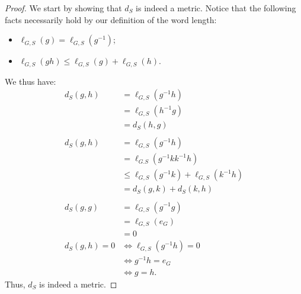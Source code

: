 \documentclass[10pt]{mypackage2}
\begin{document}
\begin{proof}
  We start by showing that $d_S$ is indeed a metric. Notice that the following facts necessarily hold by our definition of the word length:
  \begin{itemize}
    \item $\ell_{G,S}\left(g\right) = \ell_{G,S}\left(g^{-1}\right)$;
    \item $\ell_{G,S}\left(gh\right) \leq \ell_{G,S}\left(g\right) + \ell_{G,S}\left(h\right)$.
  \end{itemize}
  We thus have:
  \begin{align*}
    d_{S}\left(g,h\right) &= \ell_{G,S}\left(g^{-1}h\right)\\
                          &= \ell_{G,S}\left(h^{-1}g\right)\\
                          &= d_S\left(h,g\right)\\
                          \\
    d_{S}\left(g,h\right) &= \ell_{G,S}\left(g^{-1}h\right)\\
                          &= \ell_{G.S}\left(g^{-1}kk^{-1}h\right)\\
                          &\leq \ell_{G,S}\left(g^{-1}k\right) + \ell_{G,S}\left(k^{-1}h\right)\\
                          &= d_{S}\left(g,k\right) + d_{S}\left(k,h\right)\\
                          \\
    d_{S}\left(g,g\right) &= \ell_{G,S}\left(g^{-1}g\right)\\
                          &= \ell_{G,S}\left(e_G\right)\\
                          &= 0\\
    d_{S}\left(g,h\right) = 0 &\Leftrightarrow \ell_{G,S}\left(g^{-1}h\right) = 0\\
                              &\Leftrightarrow g^{-1}h = e_{G}\\
                              &\Leftrightarrow g = h.
  \end{align*}
  Thus, $d_S$ is indeed a metric.\newline


\end{proof}
\end{document}
